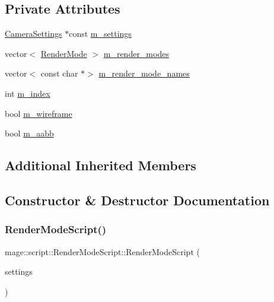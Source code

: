 \subsection*{Private Attributes}
\begin{DoxyCompactItemize}
\item 
\hyperlink{classmage_1_1_camera_settings}{Camera\+Settings} $\ast$const \hyperlink{classmage_1_1script_1_1_render_mode_script_a01e58c5b50ba1cfc72c215ed98591a1a}{m\+\_\+settings}
\item 
vector$<$ \hyperlink{namespacemage_a5e7e18b0154373ce8fc942fe3f6b27fd}{Render\+Mode} $>$ \hyperlink{classmage_1_1script_1_1_render_mode_script_a9de517ba0df8f9b3a789660e9f77734e}{m\+\_\+render\+\_\+modes}
\item 
vector$<$ const char $\ast$$>$ \hyperlink{classmage_1_1script_1_1_render_mode_script_aeda57d60e45ce2e13faaf555d2b6632c}{m\+\_\+render\+\_\+mode\+\_\+names}
\item 
int \hyperlink{classmage_1_1script_1_1_render_mode_script_a7c18b69323011be23a3ff6148b519619}{m\+\_\+index}
\item 
bool \hyperlink{classmage_1_1script_1_1_render_mode_script_ae17378247a58b28f218085211521d8bd}{m\+\_\+wireframe}
\item 
bool \hyperlink{classmage_1_1script_1_1_render_mode_script_a6b8036624a534f1107ff38744d38f606}{m\+\_\+aabb}
\end{DoxyCompactItemize}
\subsection*{Additional Inherited Members}


\subsection{Constructor \& Destructor Documentation}
\hypertarget{classmage_1_1script_1_1_render_mode_script_ad3123239ae49edd88d684da200c4fa8e}{}\label{classmage_1_1script_1_1_render_mode_script_ad3123239ae49edd88d684da200c4fa8e} 
\subsubsection{\texorpdfstring{Render\+Mode\+Script()}{RenderModeScript()}\hspace{0.1cm}{\footnotesize\ttfamily [1/3]}}
{\footnotesize\ttfamily mage\+::script\+::\+Render\+Mode\+Script\+::\+Render\+Mode\+Script (\begin{DoxyParamCaption}\item[{\hyperlink{classmage_1_1_camera_settings}{Camera\+Settings} $\ast$}]{settings }\end{DoxyParamCaption})}

